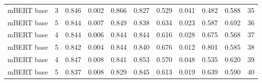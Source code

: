 \begin{tabular}{lrrrrrrrrrr}
        mBERT base &      3 &                 0.846 &          0.002 &                  0.866 &                   0.827 &                 0.529 &           0.041 &                  0.482 &                   0.588 &  35 \\
        mBERT base &      5 &                 0.844 &          0.007 &                  0.849 &                   0.838 &                 0.634 &           0.023 &                  0.587 &                   0.692 &  36 \\
        mBERT base &      4 &                 0.844 &          0.006 &                  0.844 &                   0.844 &                 0.616 &           0.028 &                  0.675 &                   0.568 &  37 \\
        mBERT base &      5 &                 0.842 &          0.004 &                  0.844 &                   0.840 &                 0.676 &           0.012 &                  0.801 &                   0.585 &  38 \\
        mBERT base &      4 &                 0.847 &          0.008 &                  0.841 &                   0.853 &                 0.570 &           0.048 &                  0.535 &                   0.620 &  39 \\
        mBERT base &      5 &                 0.837 &          0.008 &                  0.829 &                   0.845 &                 0.613 &           0.019 &                  0.639 &                   0.590 &  40 \\
\bottomrule
\end{tabular}
